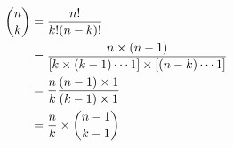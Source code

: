 \documentclass[preview]{standalone}
\begin{document}
\begin{align*}
{n \choose k} &= { {n!} \over {k! (n-k)!} } \\ &= { n \times (n-1) \over { [ k \times (k-1) \cdots 1] \times  [(n-k) \cdots 1] } } \\ &= { n \over k } { (n-1) \times 1 \over (k-1) \times 1 }\\ & = { n \over k } \times { {n-1} \choose {k-1} }
\end{align*}
\end{document}
